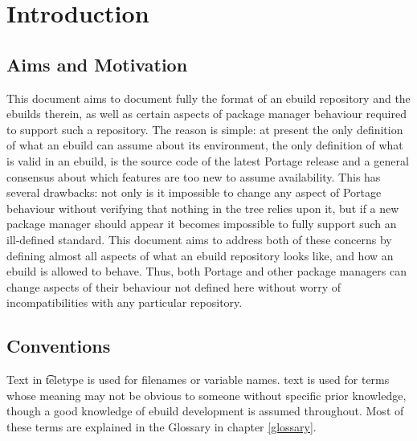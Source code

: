 \chapter{Introduction}

\section{Aims and Motivation}
This document aims to document fully the format of an ebuild repository and the ebuilds therein, as
well as certain aspects of package manager behaviour required to support such a repository. The
reason is simple: at present the only definition of what an ebuild can assume about its environment,
the only definition of what is valid in an ebuild, is the source code of the latest Portage release
and a general consensus about which features are too new to assume availability. This has several
drawbacks: not only is it impossible to change any aspect of Portage behaviour without verifying
that nothing in the tree relies upon it, but if a new package manager should appear it becomes
impossible to fully support such an ill-defined standard. This document aims to address both of
these concerns by defining almost all aspects of what an ebuild repository looks like, and how an
ebuild is allowed to behave. Thus, both Portage and other package managers can change aspects of
their behaviour not defined here without worry of incompatibilities with any particular repository.

\section{Conventions}
Text in \t{teletype} is used for filenames or variable names.  text is used for terms
whose meaning may not be obvious to someone without specific prior knowledge, though a good
knowledge of ebuild development is assumed throughout. Most of these terms are explained in the
Glossary in chapter \ref{glossary}.


